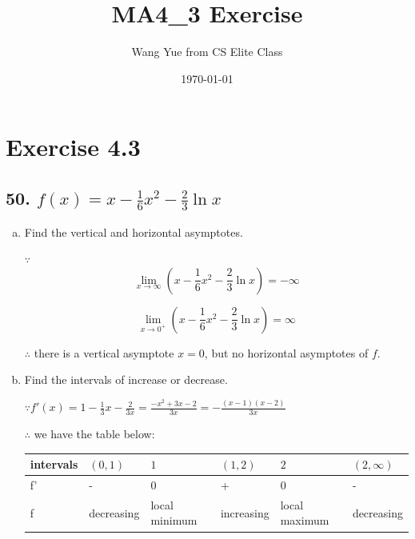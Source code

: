 \documentclass{article}
\begin{document}
    \title{MA4\_3 Exercise}
    \author{Wang Yue from CS Elite Class}
    \date{\today}

    \maketitle

    \section*{Exercise 4.3}

    \subsection*{50. $f(x) = x - \frac 1 6 x^2 - \frac 2 3 \ln x$}

    \begin{enumerate}[(a)]
        \item Find the vertical and horizontal asymptotes.


        $\because $$$\lim_{x \to \infty}(x - \frac 1 6 x^2 - \frac 2 3 \ln x) = -\infty$$

        $$\lim_{x \to 0^+}(x - \frac 1 6 x^2 - \frac 2 3 \ln x) = \infty$$

        $\therefore$ there is a vertical asymptote $x = 0$, but no horizontal asymptotes of $f$.

        \item Find the intervals of increase or decrease.

        $\because f'(x) = 1 - \frac 1 3 x - \frac 2 {3x} = \frac{-x^2 + 3x - 2}{3x} = -\frac{(x - 1)(x - 2)}{3x}$

        $\therefore$ we have the table below:

        \begin{table}[hbp]
            \begin{tabular}{@{}llllll@{}}
                \toprule
                intervals & $(0,1)$ & $1$ & $(1,2)$ & $2$ & $(2,\infty)$ \\ \midrule
                f' & - & 0 & + & 0 & - \\
                f & decreasing & local minimum & increasing & local maximum & decreasing \\ \bottomrule
            \end{tabular}
        \end{table}


\end{enumerate}
\end{document}
